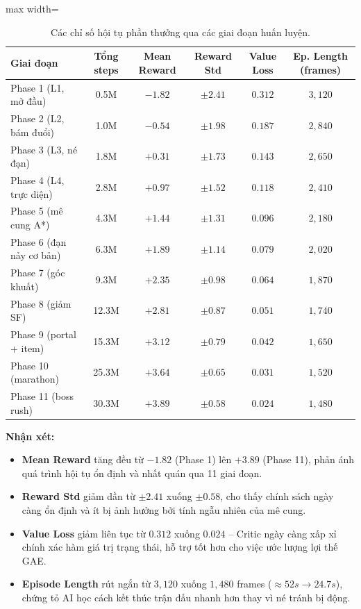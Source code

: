 \documentclass[a4paper, 12pt]{report}
\begin{document}
  \begin{table}[H]
  \centering
  \caption{Các chỉ số hội tụ phần thưởng qua các giai đoạn huấn luyện.}
  \label{tab:reward_convergence}
  \renewcommand{\arraystretch}{1.2}
  \small
  \begin{adjustbox}{max width=\textwidth}
  \begin{tabular}{l c c c c c}
    \toprule
    \textbf{Giai đoạn} & \textbf{Tổng steps} & \textbf{Mean Reward} & \textbf{Reward Std} & \textbf{Value Loss} & \textbf{Ep. Length (frames)} \\
    \midrule
    Phase 1  (L1, mở đầu)    & 0.5M  & $-1.82$ & $\pm 2.41$ & $0.312$ & $3{,}120$ \\
    Phase 2  (L2, bám đuổi)  & 1.0M  & $-0.54$ & $\pm 1.98$ & $0.187$ & $2{,}840$ \\
    Phase 3  (L3, né đạn)    & 1.8M  & $+0.31$ & $\pm 1.73$ & $0.143$ & $2{,}650$ \\
    Phase 4  (L4, trực diện) & 2.8M  & $+0.97$ & $\pm 1.52$ & $0.118$ & $2{,}410$ \\
    Phase 5  (mê cung A*)    & 4.3M  & $+1.44$ & $\pm 1.31$ & $0.096$ & $2{,}180$ \\
    Phase 6  (đạn nảy cơ bản) & 6.3M & $+1.89$ & $\pm 1.14$ & $0.079$ & $2{,}020$ \\
    Phase 7  (góc khuất)     & 9.3M  & $+2.35$ & $\pm 0.98$ & $0.064$ & $1{,}870$ \\
    Phase 8  (giảm SF)       & 12.3M & $+2.81$ & $\pm 0.87$ & $0.051$ & $1{,}740$ \\
    Phase 9  (portal + item) & 15.3M & $+3.12$ & $\pm 0.79$ & $0.042$ & $1{,}650$ \\
    Phase 10 (marathon)      & 25.3M & $+3.64$ & $\pm 0.65$ & $0.031$ & $1{,}520$ \\
    Phase 11 (boss rush)     & 30.3M & $+3.89$ & $\pm 0.58$ & $0.024$ & $1{,}480$ \\
    \bottomrule
  \end{tabular}
  \end{adjustbox}
  \end{table}

  \textbf{Nhận xét:}
  \begin{itemize}
    \item \textbf{Mean Reward} tăng đều từ $-1.82$ (Phase 1) lên $+3.89$ (Phase 11), phản ánh quá trình hội tụ ổn định và nhất quán qua 11 giai đoạn.
    \item \textbf{Reward Std} giảm dần từ $\pm 2.41$ xuống $\pm 0.58$, cho thấy chính sách ngày càng ổn định và ít bị ảnh hưởng bởi tính ngẫu nhiên của mê cung.
    \item \textbf{Value Loss} giảm liên tục từ $0.312$ xuống $0.024$ -- Critic ngày càng xấp xỉ chính xác hàm giá trị trạng thái, hỗ trợ tốt hơn cho việc ước lượng lợi thế GAE.
    \item \textbf{Episode Length} rút ngắn từ $3{,}120$ xuống $1{,}480$ frames ($\approx 52s \to 24.7s$), chứng tỏ AI học cách kết thúc trận đấu nhanh hơn thay vì né tránh bị động.
  \end{itemize}
\end{document}
